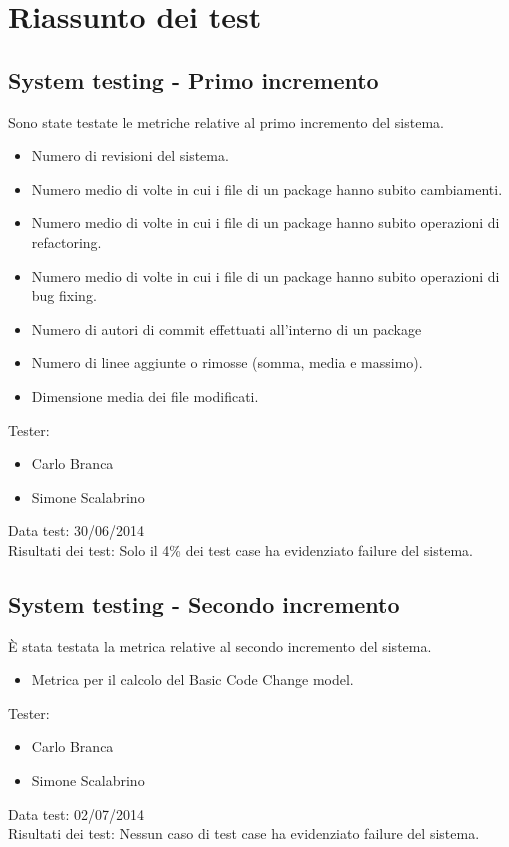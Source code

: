 \chapter{Riassunto dei test}

\section{System testing - Primo incremento}
Sono state testate le metriche relative al primo incremento del sistema.
\begin{itemize}
 \item Numero di revisioni del sistema.
 \item Numero medio di volte in cui i file di un package hanno subito cambiamenti.
 \item Numero medio di volte in cui i file di un package hanno subito operazioni di refactoring.
 \item Numero medio di volte in cui i file di un package hanno subito operazioni di bug fixing.
 \item Numero di autori di commit effettuati all’interno di un package
 \item Numero di linee aggiunte o rimosse (somma, media e massimo).
 \item Dimensione media dei file modificati.
\end{itemize}
\vspace{0.5cm}
Tester:
\begin{itemize}
\item Carlo Branca
\item Simone Scalabrino
\end{itemize}
Data test: 30/06/2014\\
Risultati dei test: Solo il 4\% dei test case ha evidenziato failure del sistema.

\section{System testing - Secondo incremento}
È stata testata la metrica relative al secondo incremento del sistema.
\begin{itemize}
 \item Metrica per il calcolo del Basic Code Change model.
\end{itemize}
Tester:
\begin{itemize}
\item Carlo Branca
\item Simone Scalabrino
\end{itemize}
Data test: 02/07/2014\\
Risultati dei test: Nessun caso di test case ha evidenziato failure del sistema.

